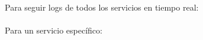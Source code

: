 \begin{infobox}
Para seguir logs de todos los servicios en tiempo real:\\
\\[4pt]
Para un servicio específico:\\
\end{infobox}
